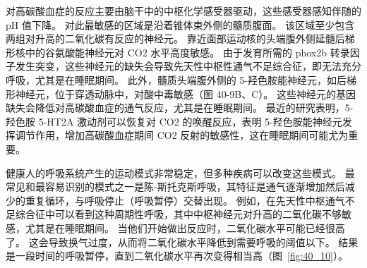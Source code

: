 对高碳酸血症的反应主要由脑干中的中枢化学感受器驱动，这些感受器感知伴随的 pH 值下降。
对此最敏感的区域是沿着锥体束外侧的髓质腹面。
该区域至少包含两组对升高的二氧化碳有反应的神经元。
靠近面部运动核的头端腹外侧延髓后梯形核中的谷氨酸能神经元对 CO2 水平高度敏感。
由于发育所需的 phox2b 转录因子发生突变，这些神经元的缺失会导致先天性中枢性通气不足综合征，即无法充分呼吸，尤其是在睡眠期间。
此外，髓质头端腹外侧的 5-羟色胺能神经元，如后梯形神经元，位于穿透动脉中，对酸中毒敏感（图 40-9B、C）。
这些神经元的基因缺失会降低对高碳酸血症的通气反应，尤其是在睡眠期间。
最近的研究表明，5-羟色胺 5-HT2A 激动剂可以恢复对 CO2 的唤醒反应，表明 5-羟色胺能神经元发挥调节作用，增加高碳酸血症期间 CO2 反射的敏感性，这在睡眠期间可能尤为重要。


健康人的呼吸系统产生的运动模式非常稳定，但多种疾病可以改变这些模式。
最常见和最容易识别的模式之一是陈-斯托克斯呼吸，其特征是通气逐渐增加然后减少的重复循环，与呼吸停止（呼吸暂停）交替出现。
例如，在先天性中枢通气不足综合征中可以看到这种周期性呼吸，其中中枢神经元对升高的二氧化碳不够敏感，尤其是在睡眠期间。 当他们开始做出反应时，二氧化碳水平可能已经很高了。
这会导致换气过度，从而将二氧化碳水平降低到需要呼吸的阈值以下。
结果是一段时间的呼吸暂停，直到二氧化碳水平再次变得相当高（图~\ref{fig:40_10}）。


